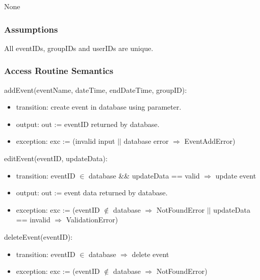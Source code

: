 \documentclass[12pt, titlepage]{article}
\begin{document}
None


\subsubsection{Assumptions}

All eventIDs, groupIDs and userIDs are unique.


\subsubsection{Access Routine Semantics}

\noindent addEvent(eventName, dateTime, endDateTime, groupID):
\begin{itemize}
\item transition: create event in database using parameter.
\item output: out := eventID returned by database.
\item exception:  exc := (invalid input $\vert\vert$ database error $\Rightarrow$ EventAddError)
\end{itemize}

\noindent editEvent(eventID, updateData):
\begin{itemize}
\item transition: eventID $\in$ database \&\& updateData == valid $\Rightarrow$ update event
\item output: out := event data returned by database.
\item exception: exc := (eventID $\notin$ database $\Rightarrow$ NotFoundError $\vert$$\vert$ updateData == invalid $\Rightarrow$ ValidationError)
\end{itemize}

\noindent deleteEvent(eventID):
\begin{itemize}
\item transition: eventID $\in$ database $\Rightarrow$ delete event
\item exception: exc := (eventID $\notin$ database $\Rightarrow$ NotFoundError)
\end{itemize}
\end{document}
